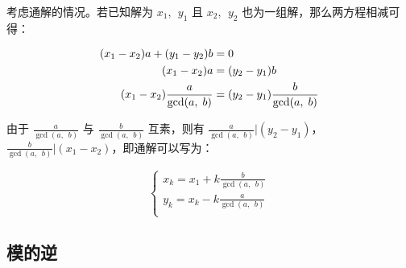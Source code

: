 \documentclass[a4paper]{article}         %
\begin{document}


考虑通解的情况。若已知解为 $x_1, \phantom{;} y_1$ 且 $x_2, \phantom{;} y_2$ 也为一组解，那么两方程相减可得：

\begin{equation}
	\begin{aligned} \notag
		(x_1 - x_2)a + (y_1 - y_2)b                  & = 0                                            \\
		(x_1 - x_2)a                                 & = (y_2 - y_1)b                                 \\
		(x_1 - x_2) \frac{a}{\gcd(a, \phantom{;} b)} & = (y_2 - y_1) \frac{b}{\gcd(a, \phantom{;} b)} \\
	\end{aligned}
\end{equation}

由于 $\frac{a}{\gcd(a, \phantom{;} b)}$ 与 $\frac{b}{\gcd(a, \phantom{;} b)}$ 互素，则有 $\frac{a}{\gcd(a, \phantom{;} b)} \vert (y_2 - y_1)$，$\frac{b}{\gcd(a, \phantom{;} b)} \vert (x_1 - x_2)$，即通解可以写为：

\begin{equation}
	\begin{cases}
		x_k = x_1 + k \frac{b}{\gcd(a, \phantom{;} b)} \\
		y_k = x_k - k \frac{a}{\gcd(a, \phantom{;} b)} \\
	\end{cases}
\end{equation}
\subsection{模的逆}


\end{document}
